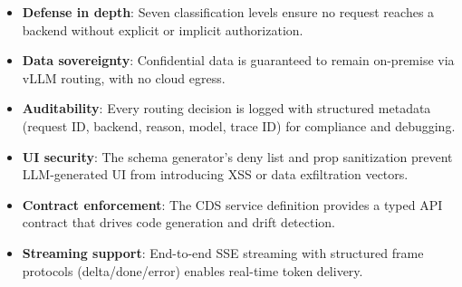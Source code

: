 \documentclass[11pt]{article}
\begin{document}
\begin{itemize}
  \item \textbf{Defense in depth}: Seven classification levels ensure no
        request reaches a backend without explicit or implicit authorization.
  \item \textbf{Data sovereignty}: Confidential data is guaranteed to remain
        on-premise via vLLM routing, with no cloud egress.
  \item \textbf{Auditability}: Every routing decision is logged with
        structured metadata (request ID, backend, reason, model, trace ID)
        for compliance and debugging.
  \item \textbf{UI security}: The schema generator's deny list and prop
        sanitization prevent LLM-generated UI from introducing XSS or data
        exfiltration vectors.
  \item \textbf{Contract enforcement}: The CDS service definition provides a
        typed API contract that drives code generation and drift detection.
  \item \textbf{Streaming support}: End-to-end SSE streaming with structured
        frame protocols (delta/done/error) enables real-time token delivery.
\end{itemize}
\end{document}
